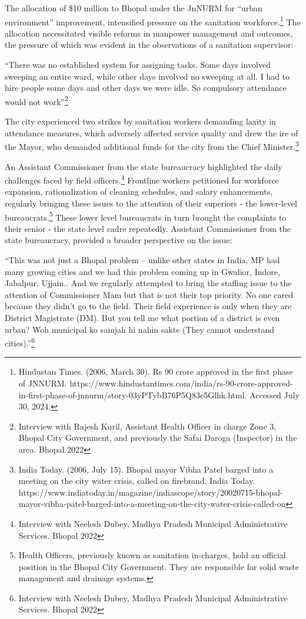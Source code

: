 The allocation of \$10 million to Bhopal under the JnNURM for ``urban environment'' improvement, intensified pressure on the sanitation workforce.\footnote{Hindustan Times. (2006, March 30). Rs 90 crore approved in the first phase of JNNURM. https://www.hindustantimes.com/india/rs-90-crore-approved-in-first-phase-of-jnnurm/story-03yPTybB76P5Q83e5Glhk.html. Accessed July 30, 2024.} The allocation necessitated visible reforms in manpower management and outcomes, the pressure of which was evident in the observations of a sanitation supervisor:

``There was no established system for assigning tasks. Some days involved sweeping an entire ward, while other days involved no sweeping at all. I had to hire people some days and other days we were idle. So compulsory attendance would not work''\footnote{Interview with Rajesh Kuril, Assistant Health Officer in charge Zone 3, Bhopal City Government, and previously the Safai Daroga (Inspector) in the area. Bhopal 2022}

The city experienced two strikes by sanitation workers demanding laxity in attendance measures, which adversely affected service quality and drew the ire of the Mayor, who demanded additional funds for the city from the Chief Minister.\footnote{India Today. (2006, July 15). Bhopal mayor Vibha Patel barged into a meeting on the city water crisis, called on firebrand. India Today. https://www.indiatoday.in/magazine/indiascope/story/20020715-bhopal-mayor-vibha-patel-barged-into-a-meeting-on-the-city-water-crisis-called-on}

An Assistant Commissioner from the state bureaucracy highlighted the daily challenges faced by field officers.\footnote{Interview with Neelesh Dubey, Madhya Pradesh Municipal Administrative Services. Bhopal 2022} Frontline workers petitioned for workforce expansion, rationalization of cleaning schedules, and salary enhancements, regularly bringing these issues to the attention of their superiors - the lower-level bureaucrats.\footnote{Health Officers, previously known as sanitation in-charges, hold an official position in the Bhopal City Government. They are responsible for solid waste management and drainage systems.} These lower level bureaucrats in turn brought the complaints to their senior - the state level cadre repeatedly. Assistant Commissioner from the state bureaucracy, provided a broader perspective on the issue:

``This was not just a Bhopal problem – unlike other states in India, MP had many growing cities and we had this problem coming up in Gwalior, Indore, Jabalpur, Ujjain.. And we regularly attempted to bring the staffing issue to the attention of Commissioner Mam but that is not their top priority. No one cared because they didn't go to the field. Their field experience is only when they are District Magistrate (DM). But you tell me what portion of a district is even urban? Woh municipal ko samjah hi nahin sakte (They cannot understand cities).''\footnote{Interview with Neelesh Dubey, Madhya Pradesh Municipal Administrative Services. Bhopal 2022}

